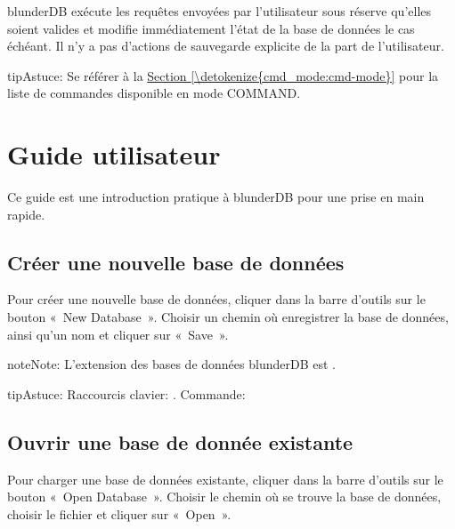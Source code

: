\documentclass[letterpaper,10pt,french]{sphinxmanual}
\begin{document}
\sphinxAtStartPar
blunderDB exécute les requêtes envoyées par l’utilisateur sous réserve
qu’elles soient valides et modifie immédiatement l’état de la base de données
le cas échéant. Il n’y a pas d’actions de sauvegarde explicite de la part
de l’utilisateur.

\begin{sphinxadmonition}{tip}{Astuce:}
\sphinxAtStartPar
Se référer à la \hyperref[\detokenize{cmd_mode:cmd-mode}]{Section \ref{\detokenize{cmd_mode:cmd-mode}}} pour la liste de commandes
disponible en mode COMMAND.
\end{sphinxadmonition}

\sphinxstepscope


\section{Guide utilisateur}
\label{\detokenize{guide_utilisateur:guide-utilisateur}}\label{\detokenize{guide_utilisateur:id1}}\label{\detokenize{guide_utilisateur::doc}}
\sphinxAtStartPar
Ce guide est une introduction pratique à blunderDB pour une prise en main
rapide.


\subsection{Créer une nouvelle base de données}
\label{\detokenize{guide_utilisateur:creer-une-nouvelle-base-de-donnees}}
\sphinxAtStartPar
Pour créer une nouvelle base de données, cliquer dans la barre d’outils sur le
bouton « New Database ». Choisir un chemin où enregistrer la base de données,
ainsi qu’un nom et cliquer sur « Save ».

\begin{sphinxadmonition}{note}{Note:}
\sphinxAtStartPar
L’extension des bases de données blunderDB est .
\end{sphinxadmonition}

\begin{sphinxadmonition}{tip}{Astuce:}
\sphinxAtStartPar
Raccourcis clavier: . Commande: 
\end{sphinxadmonition}


\subsection{Ouvrir une base de donnée existante}
\label{\detokenize{guide_utilisateur:ouvrir-une-base-de-donnee-existante}}
\sphinxAtStartPar
Pour charger une base de données existante, cliquer dans la barre d’outils sur
le bouton « Open Database ». Choisir le chemin où se trouve la base de données,
choisir le fichier  et cliquer sur « Open ».
\end{document}
